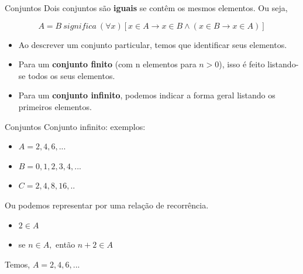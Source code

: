 \documentclass[aspectratio=169]{beamer}
\begin{document}
\begin{frame}{Conjuntos}
    Dois conjuntos são \textbf{iguais} se contêm os mesmos elementos. Ou seja,

    \[ A = B ~ significa ~ (\forall x)[ x \in A \rightarrow x \in B \land (x \in B \rightarrow x \in A)] \]

    \begin{itemize}
        \item Ao descrever um conjunto particular, temos que identificar seus elementos.
        \item Para um \textbf{conjunto finito} (com n elementos para $n > 0$), isso é feito listando-se todos os seus elementos.
        \item Para um \textbf{conjunto infinito}, podemos indicar a forma geral listando os primeiros elementos.
    \end{itemize} 

\end{frame}

\begin{frame}{Conjuntos}
    Conjunto infinito: exemplos:

    \begin{itemize}
        \item $A={2,4,6,...}$
        \item $B={0,1,2,3,4,...}$
        \item $C={2,4,8,16,..}$
    \end{itemize}

    \vspace{4mm}
Ou podemos representar por uma relação de recorrência. 

\begin{itemize}
    \item $ 2 \in A $
    \item se $ n \in A, $ então $ n + 2 \in A $
\end{itemize}

\vspace{2mm}

Temos, $A={2,4,6,...}$

\end{frame}
\end{document}
